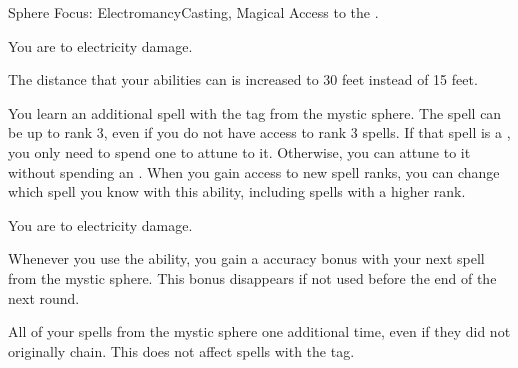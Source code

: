     \begin{magicalfeat}{Sphere Focus: Electromancy}{Casting, Magical}
        \featpre Access to the  .

         You are  to electricity damage.

         The distance that your abilities can  is increased to 30 feet instead of 15 feet.

         You learn an additional spell with the  tag from the  mystic sphere.
        The spell can be up to rank 3, even if you do not have access to rank 3 spells.
        If that spell is a , you only need to spend one  to attune to it.
        Otherwise, you can attune to it without spending an .
        When you gain access to new spell ranks, you can change which spell you know with this ability, including spells with a higher rank.

         You are  to electricity damage.

         Whenever you use the  ability, you gain a  accuracy bonus with your next spell from the  mystic sphere.
        This bonus disappears if not used before the end of the next round.

         All of your  spells from the  mystic sphere  one additional time, even if they did not originally chain.
        This does not affect spells with the  tag.
    \end{magicalfeat}

